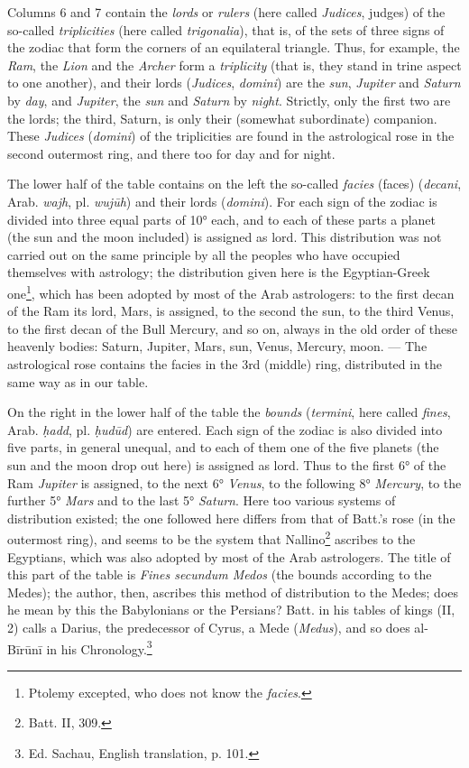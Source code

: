 \documentclass[11pt]{article}
\newcommand{\Pg}[1]{\marginpar{\footnotesize\color{gray}#1}}
\begin{document}
\par Columns 6 and 7 contain the \emph{lords} or \emph{rulers} (here called \emph{Judices}, judges) of the so-called \emph{triplicities} (here called \emph{trigonalia}), that is, of the sets of three signs of the zodiac that form the corners of an equilateral triangle. Thus, for example, the \emph{Ram}, the \emph{Lion} and the \emph{Archer} form a \emph{triplicity} (that is, they stand in trine aspect to one another), and their lords (\emph{Judices}, \emph{domini}) are the \emph{sun}, \emph{Jupiter} and \emph{Saturn} by \emph{day}, and \emph{Jupiter}, the \emph{sun} and \emph{Saturn} by \emph{night}. Strictly, only the first two are the lords; the third, Saturn, is only their (somewhat subordinate) companion. These \emph{Judices} (\emph{domini}) of the triplicities are found in the astrological rose in the second outermost ring, and there too for day and for night.\par
\par The lower half of the table contains on the left the so-called \emph{facies} (faces) (\emph{decani}, Arab. \emph{wajh}, pl. \emph{wujūh}) and their lords (\emph{domini}). For each sign of the zodiac is divided into three equal parts of 10° each, and to each of these parts a planet (the sun and the moon included) is assigned as lord. This distribution was not carried out on the same principle by all the peoples who have occupied themselves with astrology; the distribution given here is the Egyptian-Greek one\footnote{Ptolemy excepted, who does not know the \emph{facies}.}, which has been adopted by most of the Arab astrologers: to the first decan of the Ram its lord, Mars, is assigned, to the second the sun, to the third Venus, to the first decan of the Bull Mercury, and so on, always in the old order of these heavenly bodies: Saturn, Jupiter, Mars, sun, Venus, Mercury, moon. — The astrological rose contains the facies in the 3rd (middle) ring, distributed in the same way as in our table.\par
\par \Pg{105}On the right in the lower half of the table the \emph{bounds} (\emph{termini}, here called \emph{fines}, Arab. \emph{ḥadd}, pl. \emph{ḥudūd}) are entered. Each sign of the zodiac is also divided into five parts, in general unequal, and to each of them one of the five planets (the sun and the moon drop out here) is assigned as lord. Thus to the first 6° of the Ram \emph{Jupiter} is assigned, to the next 6° \emph{Venus}, to the following 8° \emph{Mercury}, to the further 5° \emph{Mars} and to the last 5° \emph{Saturn}. Here too various systems of distribution existed; the one followed here differs from that of Batt.'s rose (in the outermost ring), and seems to be the system that Nallino\footnote{Batt. II, 309.} ascribes to the Egyptians, which was also adopted by most of the Arab astrologers. The title of this part of the table is \emph{Fines secundum Medos} (the bounds according to the Medes); the author, then, ascribes this method of distribution to the Medes; does he mean by this the Babylonians or the Persians? Batt. in his tables of kings (II, 2) calls a Darius, the predecessor of Cyrus, a Mede (\emph{Medus}), and so does al-Bīrūnī in his Chronology.\footnote{Ed. Sachau, English translation, p. 101.}\par
\end{document}
